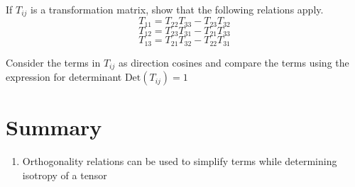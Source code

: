 
\begin{question}
	If $T_{ij}$ is a transformation matrix, show that the following relations apply.
	$$ T_{11} = T_{22} T_{33} - T_{23} T_{32} $$
	$$ T_{12} = T_{23} T_{31} - T_{21} T_{33} $$
	$$ T_{13} = T_{21} T_{32} - T_{22} T_{31} $$

\end{question}
\begin{solution}[print]
	Consider the terms in $T_{ij}$ as direction cosines and compare the terms using the expression for determinant $\text{Det}\left(T_{ij}\right)=1$
\end{solution}


\section{Summary}

\begin{enumerate}
\item Orthogonality relations can be used to simplify terms while determining isotropy of a tensor
\end{enumerate}

